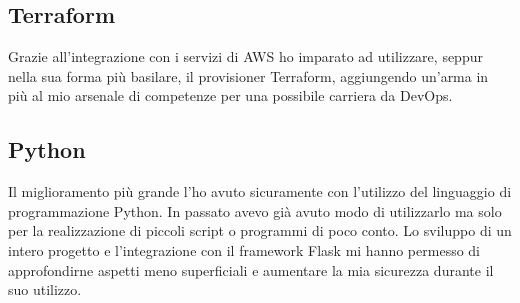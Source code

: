 \subsection{Terraform}
Grazie all'integrazione con i servizi di AWS ho imparato ad utilizzare, seppur nella sua forma più basilare, il provisioner Terraform, aggiungendo un'arma in più al mio arsenale di competenze per una possibile carriera da DevOps.
\subsection{Python}
Il miglioramento più grande l'ho avuto sicuramente con l'utilizzo del linguaggio di programmazione Python. In passato avevo già avuto modo di utilizzarlo ma solo per la realizzazione di piccoli script o programmi di poco conto. Lo sviluppo di un intero progetto e l'integrazione con il \gls{framework} Flask mi hanno permesso di approfondirne aspetti meno superficiali e aumentare la mia sicurezza durante il suo utilizzo. 
